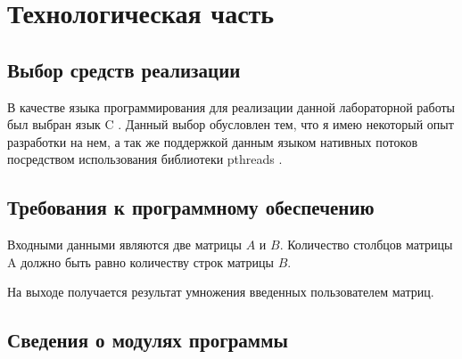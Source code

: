 \chapter{Технологическая часть}

\section{Выбор средств реализации}

В качестве языка программирования для реализации данной лабораторной работы был выбран язык C \cite{c_lang}. Данный выбор обусловлен тем, что я имею некоторый опыт разработки на нем, а так же поддержкой данным языком нативных потоков посредством использования библиотеки pthreads \cite{pthread}.

\section{Требования к программному обеспечению}

Входными данными являются две матрицы $A$ и $B$.
Количество столбцов матрицы A должно быть равно количеству строк матрицы $B$. 

На выходе получается результат умножения введенных пользователем матриц.

\section{Сведения о модулях программы}

